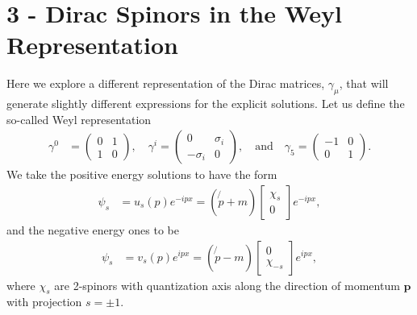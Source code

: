 \documentclass[working, oneside]{../../../Preambles/tuftebook}
\begin{document}
\let\cleardoublepage\clearpage
\thispagestyle{fancy}
\chapter{3 - Dirac Spinors in the Weyl Representation}

Here we explore a different representation of the Dirac matrices, \( \gamma_\mu \), that will generate slightly different expressions for the explicit solutions. Let us define the so-called Weyl representation
\begin{align*}
\gamma^0
&= \begin{pmatrix} 0 & 1 \\ 1 & 0 \end{pmatrix}, \quad \gamma^i = \begin{pmatrix} 0 & \sigma_i \\ -\sigma_i & 0 \end{pmatrix}, \quad \text{and} \quad \gamma_5 = \begin{pmatrix} -1 & 0 \\ 0 & 1 \end{pmatrix}. \tag{18}
\end{align*}
We take the positive energy solutions to have the form
\begin{align*}
\psi_s
&= u_s(p) e^{-i p x} = (\not{p} + m) \begin{bmatrix} \chi_s \\ 0 \end{bmatrix} e^{-i p x}, \tag{19}
\end{align*}
and the negative energy ones to be
\begin{align*}
\psi_s
&= v_s(p) e^{i p x} = (\not{p} - m) \begin{bmatrix} 0 \\ \chi_{-s} \end{bmatrix} e^{i p x}, \tag{20}
\end{align*}
where \( \chi_s \) are 2-spinors with quantization axis along the direction of momentum \( \mathbf{p} \) with projection \( s = \pm 1 \).
\end{document}
